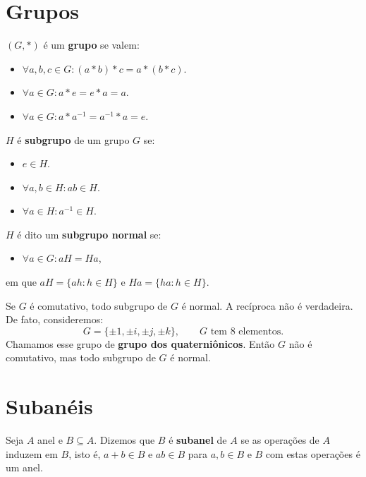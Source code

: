\documentclass[11pt,twoside,a4paper]{book}
\begin{document}
\section{Grupos}

\begin{definicao}
$(G,*)$ é um \textbf{grupo} se valem:
\begin{itemize}
\item $\forall a,b,c\in G:(a*b)*c=a*(b*c)$.
\item $\forall a\in G:a*e=e*a=a$.
\item $\forall a\in G:a*a^{-1}=a^{-1}*a=e$.
\end{itemize}
\end{definicao}

\begin{definicao}
$H$ é \textbf{subgrupo} de um grupo $G$ se:
\begin{itemize}
\item $e\in H$.
\item $\forall a,b \in H:ab\in H$.
\item $\forall a\in H:a^{-1}\in H$.
\end{itemize}
\end{definicao}

\begin{definicao}
$H$ é dito um \textbf{subgrupo normal} se:
\begin{itemize}
\item $\forall a\in G:aH=Ha$,
\end{itemize}
em que $aH=\{ah:h\in H\}$ e $Ha=\{ha:h\in H\}$.
\end{definicao}

\begin{observacao}
Se $G$ é comutativo, todo subgrupo de $G$ é normal. A recíproca não é verdadeira. De fato, consideremos:
\[
G=\{\pm1,\pm i,\pm j,\pm k\},\quad\quad G\text{ tem }8\text{ elementos.}
\]
Chamamos esse grupo de \textbf{grupo dos quaterniônicos}. Então $G$ não é comutativo, mas todo subgrupo de $G$ é normal.
\end{observacao}

\newpage

\section{Subanéis}

\begin{definicao}
Seja $A$ anel e $B\subseteq A$. Dizemos que $B$ é \textbf{subanel} de $A$ se as operações de $A$ induzem em $B$, isto é, $a+b\in B$ e $ab\in B$ para $a,b\in B$ e $B$ com estas operações é um anel.
\end{definicao}
\end{document}
